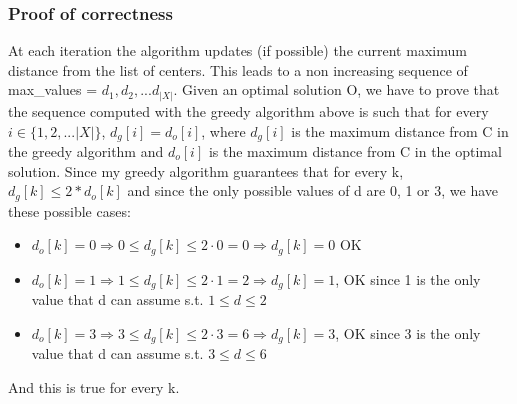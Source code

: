 \subsubsection{Proof of correctness}
At each iteration the algorithm updates (if possible) the current maximum distance from the list of centers. This leads to a non increasing sequence of max\_values = ${d_1, d_2, ... d_{|X|}}$. Given an optimal solution O, we have to prove that the sequence computed with the greedy algorithm above is such that for every $i \in \{1, 2, ... |X|\}$, $d_g[i] = d_o[i] $, where $d_g[i]$ is the maximum distance from C in the greedy algorithm and $d_o[i]$ is the maximum distance from C in the optimal solution. Since my greedy algorithm guarantees that for every k, $d_g[k] \leq 2* d_o[k]$ and since the only possible values of d are 0, 1 or 3, we have these possible cases:
\begin{itemize}
	\item $d_o[k] = 0 \Rightarrow  0 \leq d_g[k] \leq 2\cdot0 = 0 \Rightarrow d_g[k] = 0$ OK
	\item $d_o[k] = 1 \Rightarrow  1 \leq d_g[k] \leq 2\cdot1 = 2 \Rightarrow d_g[k] = 1 $, OK since 1 is the only value that d can assume s.t. $1 \leq d \leq 2$
	\item $d_o[k] = 3 \Rightarrow  3 \leq d_g[k] \leq 2\cdot3 = 6 \Rightarrow d_g[k] = 3 $, OK since 3 is the only value that d can assume s.t. $3 \leq d \leq 6$
\end{itemize}
And this is true for every k.